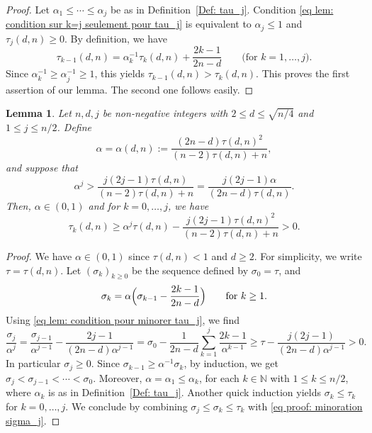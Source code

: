 \documentclass[JEP,XML,SOM,Unicode,NoFloatCountersInSection,published]{cedram}
\newcommand\bN{\mathbb{N}}
\theoremstyle{definition}
\theoremstyle{plain}
\newtheorem{Lem}[Def]{Lemma}
\begin{document}
\begin{proof}
Let $\alpha_1 \leq \cdots \leq \alpha_j$ be as in Definition~\ref{Def: tau_j}. Condition \eqref{eq lem: condition sur k=j seulement pour tau_j} is equivalent to $\alpha_j\leq 1$ and $\tau_j(d,n) \geq 0$. By definition, we have
\[
\tau_{k-1}(d,n) = \alpha_k^{-1}\tau_k(d,n) + \frac{2k-1}{2n-d} \qquad \textrm{(for $k=1,\dots,j$).}
\]
Since $\alpha_k^{-1}\geq \alpha_j^{-1}\geq 1$, this yields $\tau_{k-1}(d,n) > \tau_k(d,n)$. This proves the first assertion of our lemma. The second one follows easily.
\end{proof}

\begin{Lem}
\label{lem: minorer tau_j}
Let $n,d, j$ be non-negative integers with $2\leq d \leq \sqrt{n/4}$ and $ 1\leq j\leq n/2$. Define
\[
\alpha = \alpha(d,n) := \frac{(2n-d)\tau(d,n)^2}{(n-2)\tau(d,n)+n},
\]
and suppose that
\begin{equation}
\label{eq lem: condition pour minorer tau_j}
\alpha^{j} > \frac{j(2j-1)\tau(d,n)}{(n-2)\tau(d,n)+n} = \frac{j(2j-1)\alpha}{(2n-d)\tau(d,n)}.
\end{equation}
Then, $\alpha\in(0,1)$ and for $k=0,\dots,j$, we have
\begin{equation*}
\tau_k(d,n) \geq \alpha^j\tau(d,n) - \frac{j(2j-1)\tau(d,n)^2}{(n-2)\tau(d,n)+n} > 0.
\end{equation*}
\end{Lem}

\begin{proof}
We have $\alpha\in(0,1)$ since $\tau(d,n)< 1$ and $d\geq 2$. For simplicity, we write $\tau = \tau(d,n)$. Let $(\sigma_k)_{k\geq 0}$ be the sequence defined by $\sigma_0= \tau$, and
\begin{equation*}
\sigma_k = \alpha\Bigl(\sigma_{k-1} - \frac{2k-1}{2n-d} \Bigr) \qquad \textrm{for } k\geq 1.
\end{equation*}
Using \eqref{eq lem: condition pour minorer tau_j}, we find
\begin{equation}
\label{eq proof: minoration sigma_j}
\frac{\sigma_j}{\alpha^j} = \frac{\sigma_{j-1}}{\alpha^{j-1}} - \frac{2j-1}{(2n-d)\alpha^{j-1}} = \sigma_0 -\frac{1}{2n-d}\sum_{k=1}^{j} \frac{2k-1}{\alpha^{k-1}} \geq \tau -\frac{j(2j-1)}{(2n-d)\alpha^{j-1}} > 0.
\end{equation}
In particular $\sigma_j\geq 0$. Since $\sigma_{k-1} \geq \alpha^{-1}\sigma_k$, by induction, we get $\sigma_j < \sigma_{j-1} < \cdots < \sigma_0$. Moreover, $\alpha = \alpha_1 \leq \alpha_k$, for each $k\in\bN$ with $1\leq k \leq n/2$, where $\alpha_k$ is as in Definition~\ref{Def: tau_j}. Another quick induction yields $\sigma_k\leq \tau_k$ for $k=0,\dots,j$. We conclude by combining $\sigma_j\leq \sigma_k\leq \tau_k$ with \eqref{eq proof: minoration sigma_j}.
\end{proof}
\end{document}

